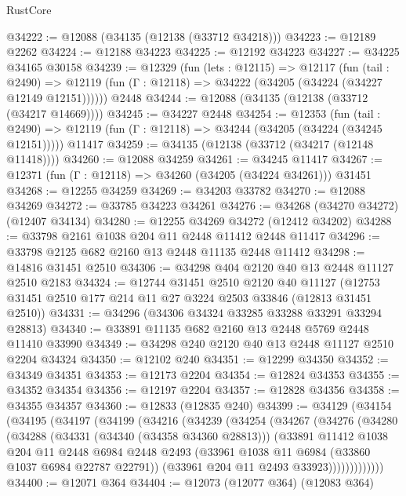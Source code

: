 \begin{lexlean}{RustCore}
\begin{coremodule}
@34222 := @12088 (@34135 (@12138 (@33712 @34218)))
@34223 := @12189 @2262
@34224 := @12188 @34223
@34225 := @12192 @34223
@34227 := @34225 @34165 @30158
@34239 := @12329
    (fun (lets : @12115) =>
    @12117
      (fun (tail : @2490) =>
      @12119 (fun (Γ : @12118) => @34222 (@34205 (@34224 (@34227 @12149 @12151))))))
    @2448
@34244 := @12088 (@34135 (@12138 (@33712 (@34217 @14669))))
@34245 := @34227 @2448
@34254 := @12353
    (fun (tail : @2490) => @12119 (fun (Γ : @12118) => @34244 (@34205 (@34224 (@34245 @12151)))))
    @11417
@34259 := @34135 (@12138 (@33712 (@34217 (@12148 @11418))))
@34260 := @12088 @34259
@34261 := @34245 @11417
@34267 := @12371 (fun (Γ : @12118) => @34260 (@34205 (@34224 @34261))) @31451
@34268 := @12255 @34259
@34269 := @34203 @33782
@34270 := @12088 @34269
@34272 := @33785 @34223 @34261
@34276 := @34268 (@34270 @34272) (@12407 @34134)
@34280 := @12255 @34269 @34272 (@12412 @34202)
@34288 := @33798 @2161 @1038 @204 @11 @2448 @11412 @2448 @11417
@34296 := @33798 @2125 @682 @2160 @13 @2448 @11135 @2448 @11412
@34298 := @14816 @31451 @2510
@34306 := @34298 @404 @2120 @40 @13 @2448 @11127 @2510 @2183
@34324 := @12744
    @31451
    @2510
    @2120
    @40
    @11127
    (@12753 @31451 @2510 @177 @214 @11 @27 @3224 @2503 @33846 (@12813 @31451 @2510))
@34331 := @34296 (@34306 @34324 @33285 @33288 @33291 @33294 @28813)
@34340 := @33891 @11135 @682 @2160 @13 @2448 @5769 @2448 @11410 @33990
@34349 := @34298 @240 @2120 @40 @13 @2448 @11127 @2510 @2204 @34324
@34350 := @12102 @240
@34351 := @12299 @34350
@34352 := @34349 @34351
@34353 := @12173 @2204
@34354 := @12824 @34353
@34355 := @34352 @34354
@34356 := @12197 @2204
@34357 := @12828 @34356
@34358 := @34355 @34357
@34360 := @12833 (@12835 @240)
@34399 := @34129
    (@34154
      (@34195
        (@34197
          (@34199
            (@34216
              (@34239
                (@34254
                  (@34267
                    (@34276
                      (@34280
                        (@34288
                          (@34331 (@34340 (@34358 @34360 @28813)))
                          (@33891
                            @11412
                            @1038
                            @204
                            @11
                            @2448
                            @6984
                            @2448
                            @2493
                            (@33961 @1038 @11 @6984 (@33860 @1037 @6984 @22787 @22791))
                            (@33961 @204 @11 @2493 @33923)))))))))))))
@34400 := @12071 @364
@34404 := @12073 (@12077 @364) (@12083 @364)

\end{coremodule}
\end{lexlean}
